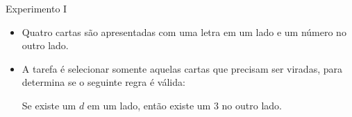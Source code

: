 \documentclass{beamer}
\begin{document}
\begin{frame}{Experimento I}


\begin{itemize}
    \item <1->Quatro cartas são apresentadas com uma letra em um lado e um número no outro lado.

\begin{center}
\end{center}

\item <2->A tarefa é selecionar somente aquelas cartas que precisam ser viradas, para determina se o seguinte regra é válida:

\begin{center}
Se existe um $d$ em um lado, então existe um $3$ no outro lado.
\end{center}


\end{itemize}


\end{frame}





\end{document}

